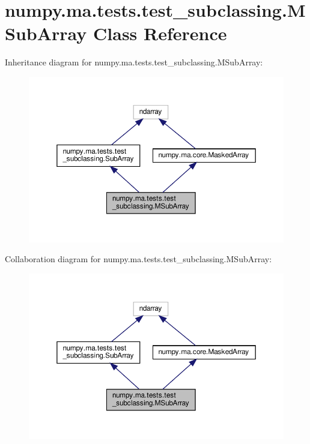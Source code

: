 \hypertarget{classnumpy_1_1ma_1_1tests_1_1test__subclassing_1_1MSubArray}{}\section{numpy.\+ma.\+tests.\+test\+\_\+subclassing.\+M\+Sub\+Array Class Reference}
\label{classnumpy_1_1ma_1_1tests_1_1test__subclassing_1_1MSubArray}


Inheritance diagram for numpy.\+ma.\+tests.\+test\+\_\+subclassing.\+M\+Sub\+Array\+:
\nopagebreak
\begin{figure}[H]
\begin{center}
\leavevmode
\includegraphics[width=350pt]{classnumpy_1_1ma_1_1tests_1_1test__subclassing_1_1MSubArray__inherit__graph}
\end{center}
\end{figure}


Collaboration diagram for numpy.\+ma.\+tests.\+test\+\_\+subclassing.\+M\+Sub\+Array\+:
\nopagebreak
\begin{figure}[H]
\begin{center}
\leavevmode
\includegraphics[width=350pt]{classnumpy_1_1ma_1_1tests_1_1test__subclassing_1_1MSubArray__coll__graph}
\end{center}
\end{figure}
